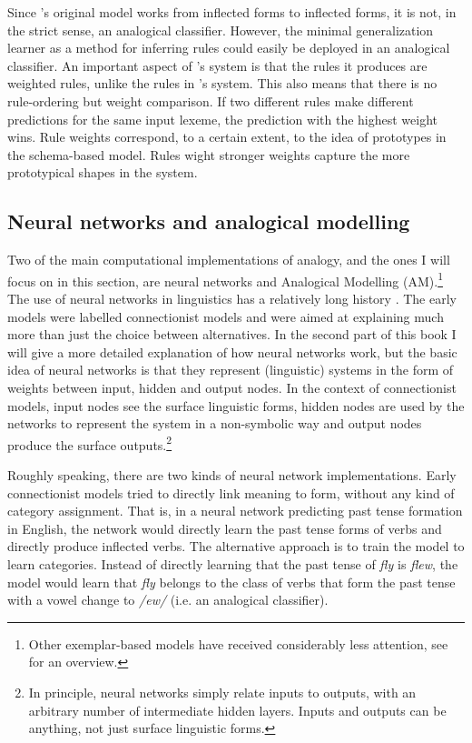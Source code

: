 Since \citet{Albright.2003}'s original model works from inflected forms to inflected forms, it is not, in the strict sense, an analogical classifier. However, the minimal generalization learner as a method for inferring rules could easily be deployed in an analogical classifier. An important aspect of \citet{Albright.2003}'s system is that the rules it produces are weighted rules, unlike the rules in \citet{Viks.1994}'s system. This also means that there is no rule-ordering but weight comparison. If two different rules make different predictions for the same input lexeme, the prediction with the highest weight wins. Rule weights correspond, to a certain extent, to the idea of prototypes in the schema-based model. Rules wight stronger weights capture the more prototypical shapes in the system.


\subsection{Neural networks and analogical modelling}


Two of the main computational implementations of analogy, and the ones I will focus on in this section, are neural networks and Analogical Modelling (AM).\footnote{Other exemplar-based models have received considerably less attention, see \citet{Matthews.2005} for an overview.} The use of neural networks in linguistics has a relatively long history \autocites{Bechtel.2002, Churchland.1989, McClelland.1986, Rumelhart.1986, Rumelhart.1986a}. The early models were labelled connectionist models and were aimed at explaining much more than just the choice between alternatives. In the second part of this book I will give a more detailed explanation of how neural networks work, but the basic idea of neural networks is that they represent (linguistic) systems in the form of weights between input, hidden and output nodes. In the context of connectionist models, input nodes see the surface linguistic forms, hidden nodes are used by the networks to represent the system in a non-symbolic way and output nodes produce the surface outputs.\footnote{In principle, neural networks simply relate inputs to outputs, with an arbitrary number of intermediate hidden layers. Inputs and outputs can be anything, not just surface linguistic forms.}

Roughly speaking, there are two kinds of neural network implementations. Early connectionist models tried to directly link meaning to form, without any kind of category assignment. That is, in a neural network predicting past tense formation in English, the network would directly learn the past tense forms of verbs and directly produce inflected verbs.
The alternative approach is to train the model to learn categories. Instead of directly learning that the past tense of \textit{fly} is \textit{flew}, the model would learn that \textit{fly} belongs to the class of verbs that form the past tense with a vowel change to \textit{/ew/} (i.e. an analogical classifier).


